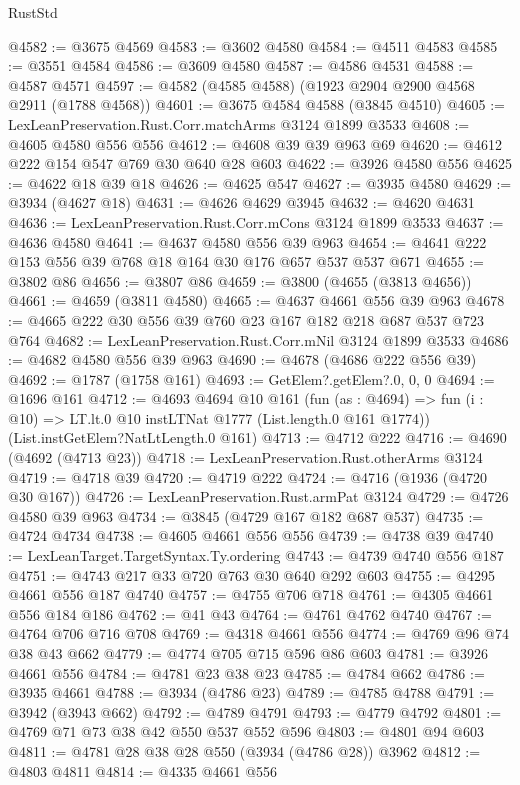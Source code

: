 \begin{lexlean}{RustStd}
\begin{coremodule}
@4582 := @3675 @4569
@4583 := @3602 @4580
@4584 := @4511 @4583
@4585 := @3551 @4584
@4586 := @3609 @4580
@4587 := @4586 @4531
@4588 := @4587 @4571
@4597 := @4582 (@4585 @4588) (@1923 @2904 @2900 @4568 @2911 (@1788 @4568))
@4601 := @3675 @4584 @4588 (@3845 @4510)
@4605 := LexLeanPreservation.Rust.Corr.matchArms @3124 @1899 @3533
@4608 := @4605 @4580 @556 @556
@4612 := @4608 @39 @39 @963 @69
@4620 := @4612 @222 @154 @547 @769 @30 @640 @28 @603
@4622 := @3926 @4580 @556
@4625 := @4622 @18 @39 @18
@4626 := @4625 @547
@4627 := @3935 @4580
@4629 := @3934 (@4627 @18)
@4631 := @4626 @4629 @3945
@4632 := @4620 @4631
@4636 := LexLeanPreservation.Rust.Corr.mCons @3124 @1899 @3533
@4637 := @4636 @4580
@4641 := @4637 @4580 @556 @39 @963
@4654 := @4641 @222 @153 @556 @39 @768 @18 @164 @30 @176 @657 @537 @537 @671
@4655 := @3802 @86
@4656 := @3807 @86
@4659 := @3800 (@4655 (@3813 @4656))
@4661 := @4659 (@3811 @4580)
@4665 := @4637 @4661 @556 @39 @963
@4678 := @4665 @222 @30 @556 @39 @760 @23 @167 @182 @218 @687 @537 @723 @764
@4682 := LexLeanPreservation.Rust.Corr.mNil @3124 @1899 @3533
@4686 := @4682 @4580 @556 @39 @963
@4690 := @4678 (@4686 @222 @556 @39)
@4692 := @1787 (@1758 @161)
@4693 := GetElem?.getElem?.{0, 0, 0}
@4694 := @1696 @161
@4712 := @4693
    @4694
    @10
    @161
    (fun (as : @4694) =>
    fun (i : @10) => LT.lt.{0} @10 instLTNat @1777 (List.length.{0} @161 @1774))
    (List.instGetElem?NatLtLength.{0} @161)
@4713 := @4712 @222
@4716 := @4690 (@4692 (@4713 @23))
@4718 := LexLeanPreservation.Rust.otherArms @3124
@4719 := @4718 @39
@4720 := @4719 @222
@4724 := @4716 (@1936 (@4720 @30 @167))
@4726 := LexLeanPreservation.Rust.armPat @3124
@4729 := @4726 @4580 @39 @963
@4734 := @3845 (@4729 @167 @182 @687 @537)
@4735 := @4724 @4734
@4738 := @4605 @4661 @556 @556
@4739 := @4738 @39
@4740 := LexLeanTarget.TargetSyntax.Ty.ordering
@4743 := @4739 @4740 @556 @187
@4751 := @4743 @217 @33 @720 @763 @30 @640 @292 @603
@4755 := @4295 @4661 @556 @187 @4740
@4757 := @4755 @706 @718
@4761 := @4305 @4661 @556 @184 @186
@4762 := @41 @43
@4764 := @4761 @4762 @4740
@4767 := @4764 @706 @716 @708
@4769 := @4318 @4661 @556
@4774 := @4769 @96 @74 @38 @43 @662
@4779 := @4774 @705 @715 @596 @86 @603
@4781 := @3926 @4661 @556
@4784 := @4781 @23 @38 @23
@4785 := @4784 @662
@4786 := @3935 @4661
@4788 := @3934 (@4786 @23)
@4789 := @4785 @4788
@4791 := @3942 (@3943 @662)
@4792 := @4789 @4791
@4793 := @4779 @4792
@4801 := @4769 @71 @73 @38 @42 @550 @537 @552 @596
@4803 := @4801 @94 @603
@4811 := @4781 @28 @38 @28 @550 (@3934 (@4786 @28)) @3962
@4812 := @4803 @4811
@4814 := @4335 @4661 @556

\end{coremodule}
\end{lexlean}
